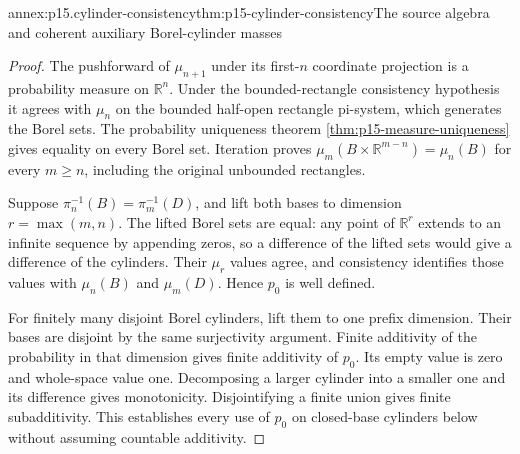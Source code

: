 \begin{annexitem}{annex:p15.cylinder-consistency}{thm:p15-cylinder-consistency}{The source algebra and coherent auxiliary Borel-cylinder masses}
\begin{proof}
The pushforward of \(\mu_{n+1}\) under its first-\(n\)
coordinate projection is a probability measure on \(\mathbb R^n\).
Under the bounded-rectangle consistency hypothesis it agrees with
\(\mu_n\) on the bounded half-open rectangle pi-system, which
generates the Borel sets. The probability uniqueness theorem
\ref{thm:p15-measure-uniqueness} gives equality on every Borel
set. Iteration proves
\(\mu_m(B\times\mathbb R^{m-n})=\mu_n(B)\) for every
\(m\geq n\), including the original unbounded rectangles.

Suppose \(\pi_n^{-1}(B)=\pi_m^{-1}(D)\), and lift both
bases to dimension \(r=\max(m,n)\). The lifted Borel sets
are equal: any point of \(\mathbb R^r\) extends to an infinite
sequence by appending zeros, so a difference of the lifted sets
would give a difference of the cylinders. Their \(\mu_r\)
values agree, and consistency identifies those values with
\(\mu_n(B)\) and \(\mu_m(D)\). Hence \(p_0\) is well defined.

For finitely many disjoint Borel cylinders, lift them to one prefix
dimension. Their bases are disjoint by the same surjectivity argument.
Finite additivity of the probability in that dimension gives finite
additivity of \(p_0\). Its empty value is zero and whole-space
value one. Decomposing a larger cylinder into a smaller one and
its difference gives monotonicity. Disjointifying a finite union
gives finite subadditivity. This establishes every use of \(p_0\)
on closed-base cylinders below without assuming countable additivity.
\end{proof}
\end{annexitem}

